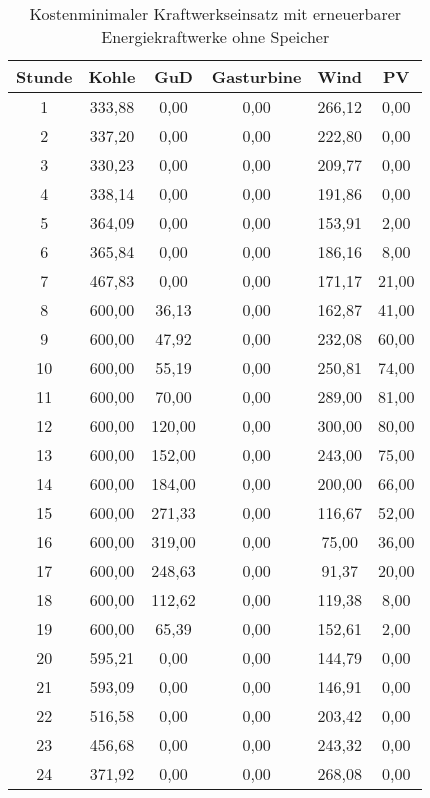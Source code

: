 \documentclass{eegreport}
\begin{document}
\begin{table}[h]
\begin{center}
\begin{tabular}{|c|c|c|c|c|c|}
\hline 
\textbf{Stunde} & \textbf{Kohle} & \textbf{GuD} & \textbf{Gasturbine} & \textbf{Wind} & \textbf{PV} \\ 
\hline 
1 & 333,88 & 0,00 & 0,00 & 266,12 & 0,00 \\ 
\hline 
2 & 337,20 & 0,00 & 0,00 & 222,80 & 0,00 \\ 
\hline 
3 & 330,23 & 0,00 & 0,00 & 209,77 & 0,00 \\ 
\hline 
4 & 338,14 & 0,00 & 0,00 & 191,86 & 0,00 \\ 
\hline 
5 & 364,09 & 0,00 & 0,00 & 153,91 & 2,00 \\ 
\hline 
6 & 365,84 & 0,00 & 0,00 & 186,16 & 8,00 \\ 
\hline 
7 & 467,83 & 0,00 & 0,00 & 171,17 & 21,00 \\ 
\hline 
8 & 600,00 & 36,13 & 0,00 & 162,87 & 41,00 \\ 
\hline 
9 & 600,00 & 47,92 & 0,00 & 232,08 & 60,00 \\ 
\hline 
10 & 600,00 & 55,19 & 0,00 & 250,81 & 74,00 \\ 
\hline 
11 & 600,00 & 70,00 & 0,00 & 289,00 & 81,00 \\ 
\hline 
12 & 600,00 & 120,00 & 0,00 & 300,00 & 80,00 \\ 
\hline 
13 & 600,00 & 152,00 & 0,00 & 243,00 & 75,00 \\ 
\hline 
14 & 600,00 & 184,00 & 0,00 & 200,00 & 66,00 \\ 
\hline 
15 & 600,00 & 271,33 & 0,00 & 116,67 & 52,00 \\ 
\hline 
16 & 600,00 & 319,00 & 0,00 & 75,00 & 36,00 \\ 
\hline 
17 & 600,00 & 248,63 & 0,00 & 91,37 & 20,00 \\ 
\hline 
18 & 600,00 & 112,62 & 0,00 & 119,38 & 8,00 \\ 
\hline 
19 & 600,00 & 65,39 & 0,00 & 152,61 & 2,00 \\ 
\hline 
20 & 595,21 & 0,00 & 0,00 & 144,79 & 0,00 \\ 
\hline 
21 & 593,09 & 0,00 & 0,00 & 146,91 & 0,00 \\ 
\hline 
22 & 516,58 & 0,00 & 0,00 & 203,42 & 0,00 \\ 
\hline 
23 & 456,68 & 0,00 & 0,00 & 243,32 & 0,00 \\ 
\hline 
24 & 371,92 & 0,00 & 0,00 & 268,08 & 0,00 \\ 
\hline 
\end{tabular} 
\end{center}
\caption{Kostenminimaler Kraftwerkseinsatz mit erneuerbarer Energiekraftwerke ohne Speicher}
\label{eosd}
\end{table}
\end{document}

